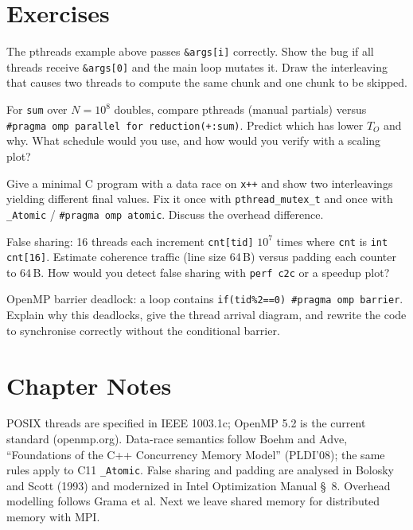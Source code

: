 \section{Exercises}
\begin{exercise}
The pthreads example above passes \texttt{\&args[i]} correctly. Show the bug if all threads receive \texttt{\&args[0]} and the main loop mutates it. Draw the interleaving that causes two threads to compute the same chunk and one chunk to be skipped.
\end{exercise}
\begin{exercise}
For \texttt{sum} over $N=10^{8}$ doubles, compare pthreads (manual partials) versus \texttt{\#pragma omp parallel for reduction(+:sum)}. Predict which has lower $T_{O}$ and why. What schedule would you use, and how would you verify with a scaling plot?
\end{exercise}
\begin{exercise}
Give a minimal C program with a data race on \texttt{x++} and show two interleavings yielding different final values. Fix it once with \texttt{pthread\_mutex\_t} and once with \texttt{\_Atomic} / \texttt{\#pragma omp atomic}. Discuss the overhead difference.
\end{exercise}
\begin{exercise}
False sharing: 16 threads each increment \texttt{cnt[tid]} $10^{7}$ times where \texttt{cnt} is \texttt{int cnt[16]}. Estimate coherence traffic (line size 64\,B) versus padding each counter to 64\,B. How would you detect false sharing with \texttt{perf c2c} or a speedup plot?
\end{exercise}
\begin{exercise}
OpenMP barrier deadlock: a loop contains \texttt{if(tid\%2==0) \#pragma omp barrier}. Explain why this deadlocks, give the thread arrival diagram, and rewrite the code to synchronise correctly without the conditional barrier.
\end{exercise}

\section*{Chapter Notes}
POSIX threads are specified in IEEE 1003.1c; OpenMP 5.2 is the current standard (openmp.org). Data-race semantics follow Boehm and Adve, ``Foundations of the C++ Concurrency Memory Model'' (PLDI'08); the same rules apply to C11 \texttt{\_Atomic}. False sharing and padding are analysed in Bolosky and Scott (1993) and modernized in Intel Optimization Manual \S~8. Overhead modelling follows Grama et al. Next we leave shared memory for distributed memory with MPI.
